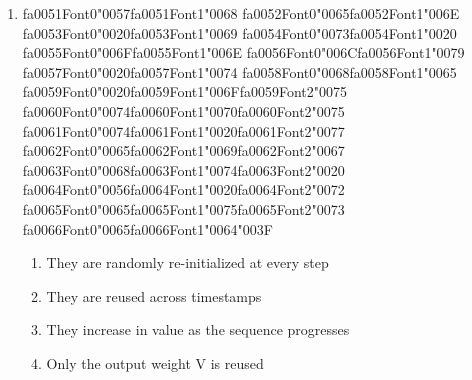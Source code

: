 \documentclass[12pt]{article}
\begin{document}
\begin{enumerate}[label=Q\arabic*.]
\item {\csname fa0051Font0\endcsname\char"0057}{\csname fa0051Font1\endcsname\char"0068} {\csname fa0052Font0\endcsname\char"0065}{\csname fa0052Font1\endcsname\char"006E} {\csname fa0053Font0\endcsname\char"0020}{\csname fa0053Font1\endcsname\char"0069} {\csname fa0054Font0\endcsname\char"0073}{\csname fa0054Font1\endcsname\char"0020} {\csname fa0055Font0\endcsname\char"006F}{\csname fa0055Font1\endcsname\char"006E} {\csname fa0056Font0\endcsname\char"006C}{\csname fa0056Font1\endcsname\char"0079} {\csname fa0057Font0\endcsname\char"0020}{\csname fa0057Font1\endcsname\char"0074} {\csname fa0058Font0\endcsname\char"0068}{\csname fa0058Font1\endcsname\char"0065} {\csname fa0059Font0\endcsname\char"0020}{\csname fa0059Font1\endcsname\char"006F}{\csname fa0059Font2\endcsname\char"0075} {\csname fa0060Font0\endcsname\char"0074}{\csname fa0060Font1\endcsname\char"0070}{\csname fa0060Font2\endcsname\char"0075} {\csname fa0061Font0\endcsname\char"0074}{\csname fa0061Font1\endcsname\char"0020}{\csname fa0061Font2\endcsname\char"0077} {\csname fa0062Font0\endcsname\char"0065}{\csname fa0062Font1\endcsname\char"0069}{\csname fa0062Font2\endcsname\char"0067} {\csname fa0063Font0\endcsname\char"0068}{\csname fa0063Font1\endcsname\char"0074}{\csname fa0063Font2\endcsname\char"0020} {\csname fa0064Font0\endcsname\char"0056}{\csname fa0064Font1\endcsname\char"0020}{\csname fa0064Font2\endcsname\char"0072} {\csname fa0065Font0\endcsname\char"0065}{\csname fa0065Font1\endcsname\char"0075}{\csname fa0065Font2\endcsname\char"0073} {\csname fa0066Font0\endcsname\char"0065}{\csname fa0066Font1\endcsname\char"0064}{\char"003F}
\begin{enumerate}[label=(\Alph*)]
    \item They are randomly re-initialized at every step
    \item They are reused across timestamps
    \item They increase in value as the sequence progresses
    \item Only the output weight V is reused
\end{enumerate}

\end{enumerate}
\end{document}
